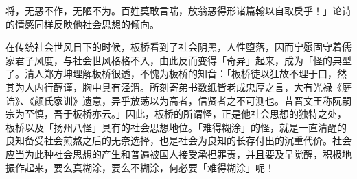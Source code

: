 \vfill
\begin{BookNotes}
\end{BookNotes}

\noindent 将，无恶不作，无陋不为。百姓莫敢言喘，放翁恶得形诸篇翰以自取戾乎！」论诗的情感同样反映他社会思想的倾向。

在传统社会世风日下的时候，板桥看到了社会阴黑，人性堕落，因而宁愿固守着儒家君子风度，与社会世风格格不入，由此反而变得「奇异」起来，成为「怪的典型了。清人郑方坤理解板桥很透，不愧为板桥的知音：「板桥徒以狂故不理于口，然其为人内行醇谨，胸中具有泾渭。所刻寄弟书数纸皆老成忠厚之言，大有光禄《庭诰》、《颜氏家训》遗意，异乎放荡以为高者，信贤者之不可测也。昔晋文王称阮嗣宗为至慎，吾于板桥亦云。」因此，板桥的所谓怪，正是他社会思想的独特之处，板桥以及「扬州八怪」具有的社会思想地位。「难得糊涂」的怪，就是一直清醒的良知备受社会煎熬之后的无奈选择，也是社会为良知的长存付出的沉重代价。社会应当为此种社会思想的产生和普遍被国人接受承担罪责，并且要及早觉醒，积极地振作起来，要么真糊涂，要么不糊涂，何必要「难得糊涂」呢！

\vfill
\begin{BookNotes}
\end{BookNotes}

